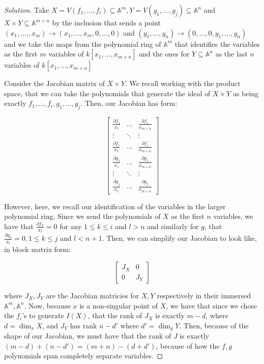 \documentclass[10pt]{article}
\begin{document}
\begin{proof}[Solution]

Take $X= V(f_1,...,f_i) \subseteq \mathbb{A}^m, Y = V(g_1,...,g_j) \subseteq \mathbb{A}^n$ and $X \times Y \subseteq \mathbb{A}^{m+n}$ by the inclusion that sends a point $(x_1,....,x_m) \to (x_1,...,x_m,0,...,0)$ and $(y_1,...,y_n) \to (0,...,0,y_1,...,y_n)$ and we take the maps from the polynomial ring of $\mathbb{A}^m$ that identifies the variables as the first $m$ variables of $k[x_1,...,x_{m+n}]$ and the ones for $Y \subseteq \mathbb{A}^{n}$ as the last $n$ variables of $k[x_1,...,x_{m+n}]$

Consider the Jacobian matrix of $X \times Y$. We recall working with the product space, that we can take the polynomials that generate the ideal of $X \times Y$ as being exactly $f_1,...,f_i, g_1,...,g_j$. Then, our Jacobian has form:

$$ \begin{bmatrix} \frac{\partial f_1}{x_1} & \hdots & \frac{\partial f_1}{x_{m+n}} \\ \vdots & \ddots &  \vdots \\ \frac{\partial f_i}{x_1} & \hdots & \frac{\partial f_i}{x_{m+n}} \\ \frac{\partial g_1}{x_1} & \hdots & \frac{\partial g_1}{x_{m+n}} \\ \vdots & \ddots &  \vdots \\ \frac{\partial g_j}{x_1} & \hdots & \frac{\partial g_j}{x_{m+n}} \end{bmatrix} $$

However, here, we recall our identification of the variables in the larger polynomial ring. Since we send the polynomials of $X$ as the first $n$ variables, we have that $\frac{\partial f_k}{x_l} = 0$ for any $1 \leq k \leq i$ and  $l > n$ and similarly for $g$, that $\frac{\partial g_k}{x_l} = 0, 1 \leq k \leq j$ and $l < n+1$. Then, we can simplify our Jacobian to look like, in block matrix form:

$$ \begin{bmatrix} J_X & 0 \\ 0 & J_Y \end{bmatrix} $$

where $J_X, J_Y$ are the Jacobian matricies for $X,Y$ respectively in their immersed $\mathbb{A}^m,\mathbb{A}^n$. Now, because $x$ is a non-singular point of $X$, we have that since we chose the $f_i$'s to generate $I(X)$, that the rank of $J_X$ is exactly $m - d$, where $d = \dim_x X$, and $J_Y$ has rank $n-d'$ where $d' = \dim_y Y$. Then, because of the shape of our Jacobian, we must have that the rank of $J$ is exactly $(m - d) + (n - d') = (m + n) - (d + d')$, because of how the $f,g$ polynomials span completely separate variables.


\end{proof}
\end{document}
